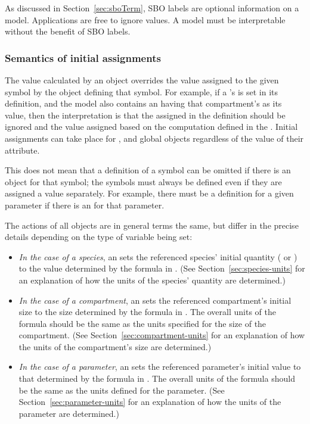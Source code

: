 As discussed in Section~\ref{sec:sboTerm}, SBO labels are optional
information on a model.  Applications are free to ignore
 values.  A model must be interpretable without the
benefit of SBO labels.


\subsubsection{Semantics of initial assignments}
\label{sec:initial-assignment-semantics}

The value calculated by an \InitialAssignment object overrides the
value assigned to the given symbol by the object defining that
symbol.  For example, if a \Compartment's  is set in
its definition, and the model also contains an \InitialAssignment
having that compartment's  as its  value,
then the interpretation is that the  assigned in the
\Compartment definition should be ignored and the value assigned
based on the computation defined in the \InitialAssignment.
Initial assignments can take place for \Compartment, \Species and
global \Parameter objects regardless of the value of their
 attribute.

This does not mean that a definition of a symbol can be omitted if
there is an \InitialAssignment object for that symbol; the symbols
must always be defined even if they are assigned a value
separately.  For example, there must be a \Parameter definition
for a given parameter if there is an \InitialAssignment for that
parameter.

The actions of all \InitialAssignment objects are in general terms
the same, but differ in the precise details depending on the type
of variable being set:
\begin{itemize}

\item \emph{In the case of a species}, an \InitialAssignment sets
  the referenced species' initial quantity
  ( or ) to
  the value determined by the formula in .  (See
  Section~\ref{sec:species-units} for an explanation of how the
  units of the species' quantity are determined.)

\item \emph{In the case of a compartment}, an \InitialAssignment
  sets the referenced compartment's initial size to the size
  determined by the formula in .  The overall units of
  the formula should be the same as the units specified for the size of the
  compartment.  (See Section~\ref{sec:compartment-units} for an
  explanation of how the units of the compartment's size are
  determined.)

\item \emph{In the case of a parameter}, an \InitialAssignment
  sets the referenced parameter's initial value to that determined
  by the formula in .  The overall units of the
  formula should be the same as the units defined for the parameter.  (See
  Section~\ref{sec:parameter-units} for an explanation of how the
  units of the parameter are determined.)

\end{itemize}

